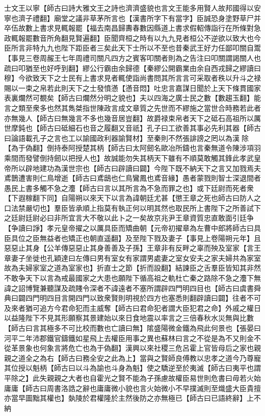 士文王以寧【師古曰詩大雅文王之詩也濟濟盛貌也言文王能多用賢人故邦國得以安寧也濟子禮翻】廟堂之議非草茅所言也【漢書所字下有當字】臣誠恐身塗野草尸并卒伍故數上書求見輒報罷【福去南昌歸夀春數因縣道上書求假軺傳詣行在所條對急政輒報罷數音所角翻見賢遍翻】臣聞齊桓之時有以九九見者桓公不逆欲以致大也今臣所言非特九九也陛下距臣者三矣此天下士所以不至也昔秦武王好力任鄙叩關自鬻【事見三卷周赧王七年周禮司關凡四方之賓客叩關者則為之告注曰叩關謂謁關人也疏曰叩猶至也好呼到翻】繆公行霸由余歸德【秦繆公開霸業由余自西戎歸之繆讀曰穆】今欲致天下之士民有上書求見者輒使詣尚書問其所言言可采取者秩以升斗之禄賜以一束之帛若此則天下之士發憤懣【懣音悶】吐忠言嘉謀日聞於上天下條貫國家表裏爛然可覩矣【師古曰爛然分明之貌也】夫以四海之廣士民之數【數趨玉翻】能言之類至衆多也然其雋桀指世陳政言成文章質之先世而不繆施之當世合時務若此者亦無幾人【師古曰無幾言不多也幾音居豈翻】故爵禄束帛者天下之砥石高祖所以厲世摩鈍也【師古曰砥細石也音之履翻又音祇】孔子曰工欲善其事必先利其器【師古曰論語載孔子之言也工以諭國政利器諭賢材】至秦則不然張誹謗之罔以為漢除【為于偽翻】倒持泰阿授楚其柄【師古曰太阿劒名歐冶所鑄也言秦無道令陳涉項羽乘間而發譬倒持劒以把授人也】故誠能勿失其柄天下雖有不順莫敢觸其鋒此孝武皇帝所以辟地建功為漢世宗也【師古曰辟讀曰闢】今陛下既不納天下之言又加戮焉夫鳶鵲遭害則仁鳥增逝【師古曰鳶鴟也仁鳥鸞鳳也鳶音緣】愚者蒙戮則智士深退間者愚民上書多觸不急之灋【師古曰言以其所言為不急而罪之也】或下廷尉而死者衆【下遐稼翻下同】自陽朔以來天下以言為諱朝廷尤甚【懲王章之死也師古曰防人之口法禁嚴切也】羣臣皆承順上指莫有執正何以明其然也取民所上書陛下之所善試下之廷尉廷尉必曰非所宜言大不敬以此卜之一矣故京兆尹王章資質忠直敢面引廷争【争讀曰諍】孝元皇帝擢之以厲具臣而矯曲朝【元帝初擢章為左曹中郎將師古曰具臣具位之臣無益者也矯正也朝直遥翻】及至陛下戮及妻子【事見上卷陽朔元年】且惡惡止其身【公羊傳惡惡止其身善善及子孫】王章非有反畔之辜而殃及室家【言王章妻子坐徙也孔穎達曰左傳曰男有室女有家謂男處妻之室女安夫之家夫婦共為家室故為夫婦家室之道為室家也】折直士之節【折而設翻】結諫臣之舌羣臣皆知其非然不敢争天下以言為戒最國家之大患也願陛下循高祖之軌杜亡秦之路除不急之灋下無諱之詔博覽兼聽謀及疏賤令深者不諱遠者不塞所謂辟四門明四目也【師古曰虞書舜典曰闢四門明四目言開四門以致衆賢則明視於四方也塞悉則翻辟讀曰闢】往者不可及來者猶可追方今君命犯而主威奪【師古曰君命犯者謂大臣犯君之命】外戚之權日以益隆陛下不見其形願察其景建始以來日食地震以率言之三倍春秋水災無與比數【師古曰言其極多不可比校而數也亡讀曰無】隂盛陽微金鐵為飛此何景也【張晏曰河平二年沛郡鐵官鑄鐵如星飛上去權臣用事之異也蘇林曰言之不從是為不又則金不從革景象也何象言將危亡也為于偽翻】漢興以來社稷三危呂霍上官皆母后之家也親親之道全之為右【師古曰務全安之此為上】當與之賢師良傅教以忠孝之道今乃尊寵其位授以魁柄【師古曰以斗為諭也斗身為魁】使之驕逆至於夷滅【師古曰夷平也謂平除之】此失親親之大者也自霍光之賢不能為子孫慮故權臣易世則危書曰毋若火始庸庸【師古曰周書洛誥之辭也庸庸微小貌也言火始微小不早撲滅則至熾盛大臣貴擅亦當早圖黜其權也】埶陵於君權隆於主然後防之亦無極已【師古曰已語終辭】上不納


